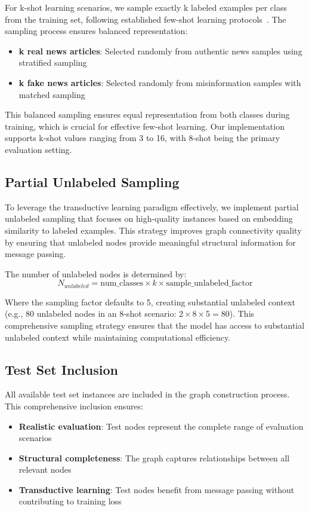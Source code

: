 For k-shot learning scenarios, we sample exactly k labeled examples per class from the training set, following established few-shot learning protocols~\cite{wang2020fewshot, finn2017model}. The sampling process ensures balanced representation:
\begin{itemize}
    \item \textbf{k real news articles}: Selected randomly from authentic news samples using stratified sampling
    \item \textbf{k fake news articles}: Selected randomly from misinformation samples with matched sampling
\end{itemize}

This balanced sampling ensures equal representation from both classes during training, which is crucial for effective few-shot learning. Our implementation supports k-shot values ranging from 3 to 16, with 8-shot being the primary evaluation setting.

\subsection{Partial Unlabeled Sampling}

To leverage the transductive learning paradigm effectively, we implement partial unlabeled sampling that focuses on high-quality instances based on embedding similarity to labeled examples. This strategy improves graph connectivity quality by ensuring that unlabeled nodes provide meaningful structural information for message passing.

The number of unlabeled nodes is determined by:
\begin{equation}
N_{unlabeled} = \text{num\_classes} \times k \times \text{sample\_unlabeled\_factor}
\end{equation}

Where the sampling factor defaults to 5, creating substantial unlabeled context (e.g., 80 unlabeled nodes in an 8-shot scenario: $2 \times 8 \times 5 = 80$). This comprehensive sampling strategy ensures that the model has access to substantial unlabeled context while maintaining computational efficiency.

\subsection{Test Set Inclusion}

All available test set instances are included in the graph construction process. This comprehensive inclusion ensures:
\begin{itemize}
    \item \textbf{Realistic evaluation}: Test nodes represent the complete range of evaluation scenarios
    \item \textbf{Structural completeness}: The graph captures relationships between all relevant nodes
    \item \textbf{Transductive learning}: Test nodes benefit from message passing without contributing to training loss
\end{itemize}

